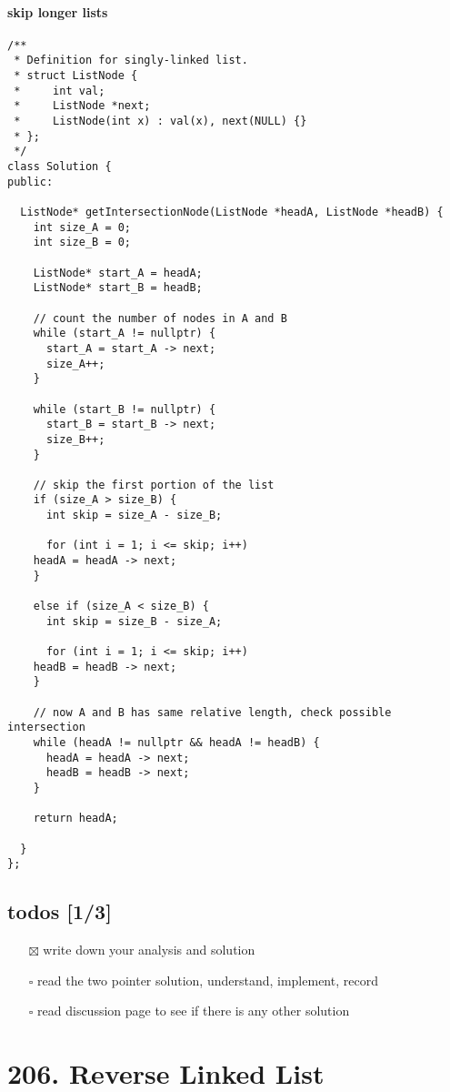 \documentclass[12pt]{book}
\begin{document}
\subsubsection{skip longer lists}
\label{sec:orgb8a45f5}
\begin{verbatim}
/**
 * Definition for singly-linked list.
 * struct ListNode {
 *     int val;
 *     ListNode *next;
 *     ListNode(int x) : val(x), next(NULL) {}
 * };
 */
class Solution {
public:

  ListNode* getIntersectionNode(ListNode *headA, ListNode *headB) {
    int size_A = 0;
    int size_B = 0;

    ListNode* start_A = headA;
    ListNode* start_B = headB;

    // count the number of nodes in A and B
    while (start_A != nullptr) {
      start_A = start_A -> next;
      size_A++;
    }

    while (start_B != nullptr) {
      start_B = start_B -> next;
      size_B++;
    }

    // skip the first portion of the list
    if (size_A > size_B) {
      int skip = size_A - size_B;

      for (int i = 1; i <= skip; i++)
	headA = headA -> next;
    }

    else if (size_A < size_B) {
      int skip = size_B - size_A;

      for (int i = 1; i <= skip; i++)
	headB = headB -> next;
    }

    // now A and B has same relative length, check possible intersection
    while (headA != nullptr && headA != headB) {
      headA = headA -> next;
      headB = headB -> next;
    }

    return headA;

  }
};
\end{verbatim}
\section{todos [1/3]}
\label{sec:org3279a86}
\begin{itemize}
\item[{$\boxtimes$}] write down your analysis and solution
\item[{$\square$}] read the two pointer solution, understand, implement, record
\item[{$\square$}] read discussion page to see if there is any other solution
\end{itemize}
\chapter{206. Reverse Linked List}
\label{sec:org862039a}
\end{document}
